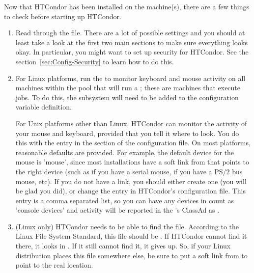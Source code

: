 
Now that HTCondor has been installed on the machine(s), there are a few
things to check before starting up HTCondor.

\begin{enumerate}
\item Read through the  file.  There are a
    lot of possible settings and you should at least take a look at
    the first two main sections to make sure everything looks okay.
    In particular, you might want to set up security for
    HTCondor.  See the section~\ref{sec:Config-Security}
    to learn how to do this.

\item For Linux platforms, run the  to monitor keyboard
    and mouse activity on all machines within the pool that will
    run a ; these are machines that execute jobs.
    To do this, the subsystem  will need to be added to
    the  configuration variable definition.

    For Unix platforms other than Linux,
    HTCondor can monitor the activity of your mouse and keyboard,
    provided that you tell it where to look.  You do this with the
     entry in the  section of
    the configuration file.  On most platforms, reasonable
    defaults are provided.
    For example, the default device for the mouse
    is 'mouse', since most installations have a soft link from
     that points to the right device (such as
     if you have a serial mouse,  if you have
    a PS/2 bus mouse, etc).  If you do not have a 
    link, you should either create one (you will be glad you did), or
    change the  entry in HTCondor's
    configuration file.
    This entry is a comma separated list, so you can have any
    devices in  count as 'console devices' and activity
    will be reported in the 's ClassAd as
    .

\item  (Linux only) HTCondor needs to be able to find the  file.
    According to the Linux File System Standard, this file should be
    .  If HTCondor cannot find it there, it looks in
    .  If it still cannot find it, it gives up.  So, if
    your Linux distribution places this file somewhere else, be sure to
    put a soft link from  to point to the real location.

\end{enumerate}

